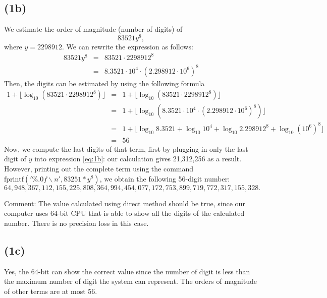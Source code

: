 \documentclass[11pt]{article}
\newcommand{\1}{\mathbbm{1}}
\begin{document}
\subsection*{(1b)}
We estimate the order of magnitude (number of digits) of 
\begin{equation}\label{eq:1b}
83521y^8,
\end{equation}
where $y=2298912$. We can rewrite the expression as follows:
	\begin{eqnarray*}
		83521y^8 &=& 83521\cdot 2298912^8\\
				 &=& 8.3521\cdot10^4 \cdot (2.298912\cdot10^6)^8
	\end{eqnarray*}
Then, the digits can be estimated by using the following formula 
	\begin{eqnarray*}
		1+\lfloor \log_{10} (83521\cdot 2298912^8)\rfloor &=& 1+\lfloor \log_{10} (83521\cdot 2298912^8)\rfloor\\
		&=&  1+\lfloor \log_{10} (8.3521\cdot10^4 \cdot (2.298912\cdot10^6)^8)\rfloor\\
			&=&  1+\lfloor \log_{10} 8.3521+\log_{10}10^4 + \log_{10}2.298912^8 +\log_{10} (10^6)^8\rfloor\\
			&=& 56
	\end{eqnarray*} 
Now, we compute the last digits of that term, first by plugging in only the last digit of $y$ into expression \eqref{eq:1b}: our calculation gives 21,312,256 as a result. However, printing out the complete term using the command $\text{fprintf}('\%.0f\backslash n',83251*y^8)$, we obtain the following 56-digit number:
\[64,948,367,112,155,225,808,364,994,454,077,172,753,899,719,772,317,155,328.\] 

Comment: The value calculated using direct method should be true, since our computer uses 64-bit CPU that is able to show all the digits of the calculated number. There is no precision loss in this case.

\subsection*{(1c)}
Yes, the 64-bit can show the correct value since the number of digit is less than the maximum number of digit the system can represent. The orders of magnitude of other terms are at most 56. 

	
\end{document}
